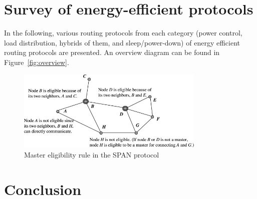 \documentclass[conference]{IEEEtran}
\begin{document}
\section{Survey of energy-efficient protocols}
In the following, various routing protocols from each category (power control,
load distribution, hybrids of them, and sleep/power-down) of energy
efficient routing protocols are presented. An overview diagram can be found
in Figure~\ref{fig:overview}.


\begin{figure}
\centering
\includegraphics[width=0.8\textwidth]{images/span-master-example}
\caption{Master eligibility rule in the SPAN protocol\cite{alotaibi2012survey}}
\label{spanmaster}
\end{figure}





\section{Conclusion}




\end{document}
